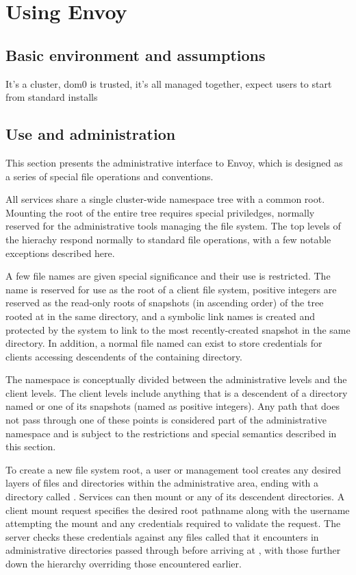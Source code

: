 \section{Using Envoy}

\subsection{Basic environment and assumptions}



It's a cluster, dom0 is trusted, it's all managed together, expect users to start from standard installs

\subsection{Use and administration}

This section presents the administrative interface to Envoy, which is designed as a series of special file operations and conventions.

All services share a single cluster-wide namespace tree with a common root. Mounting the root of the entire tree requires special priviledges, normally reserved for the administrative tools managing the file system. The top levels of the hierachy respond normally to standard file operations, with a few notable exceptions described here.

A few file names are given special significance and their use is restricted. The name \current is reserved for use as the root of a client file system, positive integers are reserved as the read-only roots of snapshots (in ascending order) of the tree rooted at \current in the same directory, and a symbolic link names \snapshot is created and protected by the system to link to the most recently-created snapshot in the same directory. In addition, a normal file named \password can exist to store credentials for clients accessing descendents of the containing directory.

The namespace is conceptually divided between the administrative levels and the client levels. The client levels include anything that is a descendent of a directory named \current or one of its snapshots (named as positive integers). Any path that does not pass through one of these points is considered part of the administrative namespace and is subject to the restrictions and special semantics described in this section.

To create a new file system root, a user or management tool creates any desired layers of files and directories within the administrative area, ending with a directory called \current. Services can then mount \current or any of its descendent directories. A client mount request specifies the desired root pathname along with the username attempting the mount and any credentials required to validate the request. The server checks these credentials against any files called \password that it encounters in administrative directories passed through before arriving at \current, with those further down the hierarchy overriding those encountered earlier.

